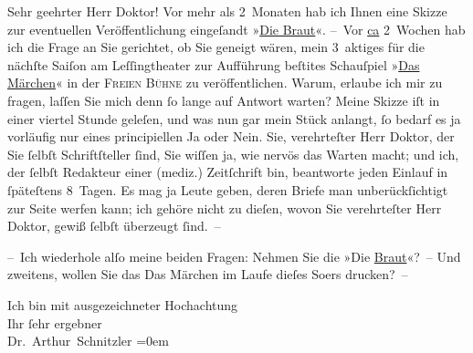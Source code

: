 \pstart{}Sehr geehrter Herr Doktor!\pend\vspace{0.5em}
\pstart
           Vor mehr als 2 Monaten hab ich Ihnen eine Skizze zur eventuellen Veröffentlichung eingeſandt »\uline{Die Braut}«. – Vor \uline{ca} 2 Wochen hab ich die Frage an Sie
               gerichtet, ob Sie geneigt wären, mein 3 aktiges für die nächſte Saiſon am Leſſingtheater zur Aufführung beſti{\geminationm}tes Schauſpiel »\uline{Das Märchen}« {\pb}in der \textsc{Freien Bühne} zu veröffentlichen. Warum, erlaube ich mir zu fragen, laſſen Sie mich denn ſo
               lange auf Antwort warten? Meine Skizze iſt in einer viertel Stunde geleſen, und was nun gar mein Stück anlangt, ſo bedarf es ja
               vorläufig nur eines principiellen Ja oder Nein. Sie, verehrteſter Herr Doktor, {\pb}der Sie ſelbſt Schriftſteller ſind, Sie wiſſen ja, wie
               nervös das Warten macht; und ich, der ſelbſt Redakteur einer (mediz.) Zeitſchrift bin, beantworte jeden Einlauf in
               ſpäteſtens 8 Tagen. Es mag ja Leute geben, deren Briefe man unberückſichtigt zur
               Seite werfen kann; ich gehöre {\pb}nicht zu dieſen, wovon Sie
               verehrteſter Herr Doktor, gewiß ſelbſt überzeugt ſind. –\pend
           
\pstart
           – Ich wiederhole alſo meine beiden Fragen: Nehmen Sie die »Die \uline{Braut}«? – Und zweitens, wollen Sie das Das
                  Märchen im Laufe dieſes So{\geminationm}ers
               drucken? –\pend
           
\pstart
           Ich bin mit ausgezeichneter Hochachtung{\\[\baselineskip]}Ihr ſehr ergebner{\\[\baselineskip]}\spacefill\mbox{Dr. Arthur Schnitzler}\pend
           \leftskip=0em{}\endnumbering{}  
      
